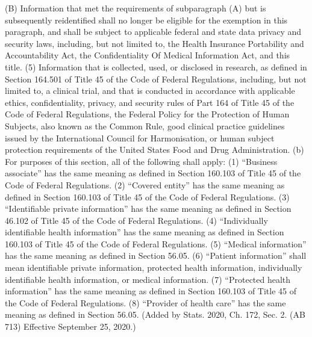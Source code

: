 (B) Information that met the requirements of subparagraph (A) but is subsequently reidentified shall no longer be eligible for the exemption in this paragraph, and shall be subject to applicable federal and state data privacy and security laws, including, but not limited to, the Health Insurance Portability and Accountability Act, the Confidentiality Of Medical Information Act, and this title.
(5) Information that is collected, used, or disclosed in research, as defined in Section 164.501 of Title 45 of the Code of Federal Regulations, including, but not limited to, a clinical trial, and that is conducted in accordance with applicable ethics, confidentiality, privacy, and security rules of Part 164 of Title 45 of the Code of Federal Regulations, the Federal Policy for the Protection of Human Subjects, also known as the Common Rule, good clinical practice guidelines issued by the International Council for Harmonisation, or human subject protection requirements of the United States Food and Drug Administration.
(b) For purposes of this section, all of the following shall apply:
(1) “Business associate” has the same meaning as defined in Section 160.103 of Title 45 of the Code of Federal Regulations.
(2) “Covered entity” has the same meaning as defined in Section 160.103 of Title 45 of the Code of Federal Regulations.
(3) “Identifiable private information” has the same meaning as defined in Section 46.102 of Title 45 of the Code of Federal Regulations.
(4) “Individually identifiable health information” has the same meaning as defined in Section 160.103 of Title 45 of the Code of Federal Regulations.
(5) “Medical information” has the same meaning as defined in Section 56.05.
(6) “Patient information” shall mean identifiable private information, protected health information, individually identifiable health information, or medical information.
(7) “Protected health information” has the same meaning as defined in Section 160.103 of Title 45 of the Code of Federal Regulations.
(8) “Provider of health care” has the same meaning as defined in Section 56.05.
(Added by Stats. 2020, Ch. 172, Sec. 2. (AB 713) Effective September 25, 2020.)

